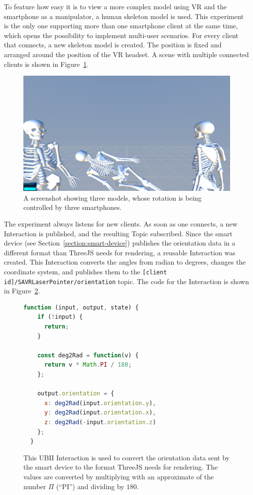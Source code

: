To feature how easy it is to view a more complex model using \gls{VR} and the smartphone as a manipulator, a human skeleton model is used. This experiment is the only one supporting more than one smartphone client at the same time, which opens the possibility to implement multi-user scenarios. For every client that connects, a new skeleton model is created. The position is fixed and arranged around the position of the \gls{VR} headset. A scene with multiple connected clients is shown in Figure~\ref{fig:screenshot-exp-mv}.

\begin{figure}[H]
	\centering
	\includegraphics[width=12cm]{figures/implementation/screenshot_exp_mv.png}
	\caption[Screenshot of the model viewer]{A screenshot showing three models, whose rotation is being controlled by three smartphones.}\label{fig:screenshot-exp-mv}
\end{figure}

The experiment always listens for new clients. As soon as one connects, a new Interaction is published, and the resulting Topic subscribed. Since the smart device (see Section~\ref{section:smart-device}) publishes the orientation data in a different format than ThreeJS needs for rendering, a reusable Interaction was created. This Interaction converts the angles from radian to degrees, changes the coordinate system, and publishes them to the \lstinline[breaklines=true]{[client id]/SAVRLaserPointer/orientation} topic. The code for the Interaction is shown in Figure~\ref{fig:ubii-interaction-angles}.

\begin{figure}[H]
	\begin{lstlisting}[language=JavaScript]
  function (input, output, state) {
    if (!input) {
      return;
    }

    const deg2Rad = function(v) {
      return v * Math.PI / 180;
    };

    output.orientation = {
      x: deg2Rad(input.orientation.y),
      y: deg2Rad(input.orientation.x),
      z: deg2Rad(-input.orientation.z)
    };
  }
 \end{lstlisting}
	\caption[A UBII Interaction of model viewer]{This \gls{UBII} Interaction is used to convert the orientation data sent by the smart device to the format ThreeJS needs for rendering. The values are converted by multiplying with an approximate of the number $\Pi$ (\enquote{PI}) and dividing by $180$.}\label{fig:ubii-interaction-angles} %
\end{figure}


